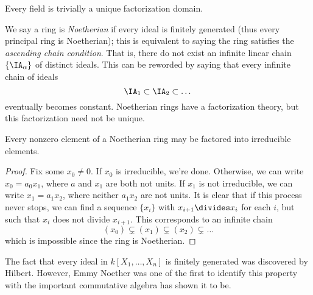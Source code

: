 \begin{example}
    Every field is trivially a unique factorization domain.
\end{example}

We say a ring is \emph{Noetherian} if every ideal is finitely generated (thus every principal ring is Noetherian); this is equivalent to saying the ring satisfies the {\it ascending chain condition}. That is, there do not exist an infinite linear chain $\{ \IA_\alpha \}$ of distinct ideals. This can be reworded by saying that every infinite chain of ideals
%
\[ \IA_1 \subset \IA_2 \subset \dots \]
%
eventually becomes constant. Noetherian rings have a factorization theory, but this factorization need not be unique.

\begin{theorem}
    Every nonzero element of a Noetherian ring may be factored into irreducible elements.
\end{theorem}
\begin{proof}
    Fix some $x_0 \neq 0$. If $x_0$ is irreducible, we're done. Otherwise, we can write $x_0 = a_0x_1$, where $a$ and $x_1$ are both not units. If $x_1$ is not irreducible, we can write $x_1 = a_1x_2$, where neither $a_1x_2$ are not units. It is clear that if this process never stops, we can find a sequence $\{ x_i \}$ with $x_{i+1} \divides x_i$ for each $i$, but such that $x_i$ does not divide $x_{i+1}$. This corresponds to an infinite chain
    \[ (x_0) \subsetneq (x_1) \subsetneq (x_2) \subsetneq \dots \]
    which is impossible since the ring is Noetherian.
\end{proof}

The fact that every ideal in $k[X_1, \dots, X_n]$ is finitely generated was discovered by Hilbert. However, Emmy Noether was one of the first to identify this property with the important commutative algebra has shown it to be.

